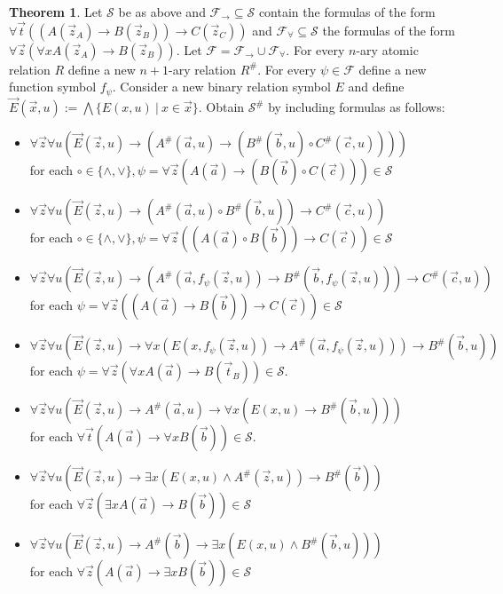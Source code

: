 \documentclass[a4paper,11pt]{report}
\theoremstyle{definition}
\newtheorem{theorem}{Theorem}[section]
\theoremstyle{definition}
\theoremstyle{definition}
\theoremstyle{definition}
\theoremstyle{definition}
\theoremstyle{definition}
\theoremstyle{definition}
\begin{document}
	\begin{theorem}\label{fullFOtranslation}
		Let $\mathcal S$ be as above and $\mathcal F_\to\subseteq\mathcal S$ contain the formulas of the form $\forall \vec t((A(\vec z_A)\to B(\vec z_B))\to C(\vec z_C))$ and $\mathcal F_\forall\subseteq\mathcal S$ the formulas of the form $\forall \vec z(\forall xA(\vec z_A)\to B(\vec z_B))$. Let $\mathcal F = \mathcal F_\to\cup\mathcal F_\forall$. For every $n$-ary atomic relation $R$ define a new $n+1$-ary relation $R^\#$. For every $\psi\in\mathcal F$ define a new function symbol $f_\psi$. Consider a new binary relation symbol $E$ and define $\vec E(\vec x, u) := \bigwedge\{E(x, u)\:|\:x\in\vec x\}$. Obtain $\mathcal S^\#$ by including formulas as follows:
		\begin{itemize}
			\item $\forall \vec z\forall u(\vec E(\vec z, u)\to (A^\#(\vec a, u)\to (B^\#(\vec b, u)\circ C^\#(\vec c, u))))$\\for each $\circ\in\{\wedge, \vee\}, \psi = \forall \vec z(A(\vec a)\to (B(\vec b)\circ C(\vec c)))\in\mathcal S$
			\item $\forall \vec z\forall u(\vec E(\vec z, u)\to (A^\#(\vec a, u)\circ B^\#(\vec b, u))\to C^\#(\vec c, u))$\\for each $\circ\in\{\wedge, \vee\}, \psi = \forall \vec z((A(\vec a)\circ B(\vec b))\to C(\vec c))\in\mathcal S$
			\item $\forall \vec z\forall u(\vec E(\vec z, u)\to(A^\#(\vec a, f_\psi(\vec z, u))\to B^\#(\vec b, f_\psi(\vec z, u)))\to C^\#(\vec c, u))$\\for each $\psi = \forall \vec z((A(\vec a)\to B(\vec b))\to C(\vec c))\in\mathcal S$
			\item  $\forall \vec z\forall u(\vec E(\vec z, u)\to \forall x(E(x, f_\psi(\vec z, u))\to A^\#(\vec a, f_\psi(\vec z, u)))\to B^\#(\vec b, u))$\\for each $\psi = \forall \vec z(\forall xA(\vec a)\to B(\vec t_B))\in\mathcal S$.
			\item $\forall \vec z\forall u(\vec E(\vec z, u)\to A^\#(\vec a, u)\to \forall x(E(x, u)\to B^\#(\vec b, u)))$\\for each $\forall \vec t(A(\vec a)\to \forall xB(\vec b))\in\mathcal S$.
			\item $\forall \vec z\forall u(\vec E(\vec z, u)\to \exists x(E(x, u)\wedge A^\#(\vec z, u))\to B^\#(\vec b))$\\for each $\forall \vec z(\exists xA(\vec a)\to B(\vec b))\in\mathcal S$
			\item $\forall \vec z\forall u(\vec E(\vec z, u)\to A^\#(\vec b)\to \exists x(E(x, u)\wedge B^\#(\vec b, u)))$\\for each $\forall \vec z(A(\vec a)\to \exists xB(\vec b))\in\mathcal S$

\end{itemize}
\end{theorem}
\end{document}

